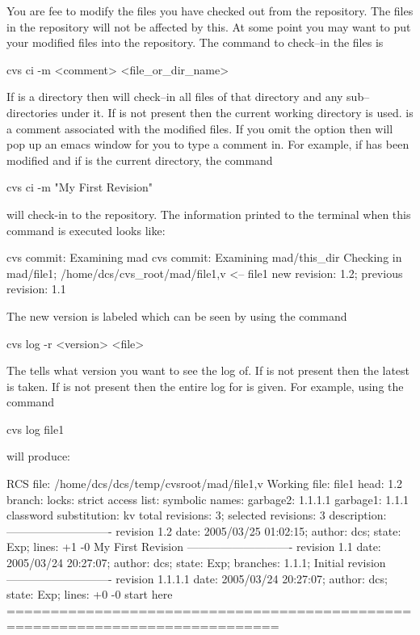 You are fee to modify the files you have checked out from the
repository. The files in the repository will not be affected by this.
At some point you may want to put your modified files into the
repository. The command to check--in the files is
\begin{example}
  cvs ci -m <comment> <file_or_dir_name>
\end{example}
If  is a directory then \cvs will check--in all
files of that directory and any sub--directories under it. If
 is not present then the current working
directory is used.  is a comment associated with the
modified files. If you omit the  option then \cvs
will pop up an emacs window for you to type a comment in.
For example, if  has been modified
and if  is the current directory, the command
\begin{example}
  cvs ci -m "My First Revision"
\end{example}
will check-in  to the repository. The information printed to
the terminal when this command is executed looks like:
\begin{example}
  cvs commit: Examining mad
  cvs commit: Examining mad/this_dir
  Checking in mad/file1;
  /home/dcs/cvs_root/mad/file1,v  <--  file1
  new revision: 1.2; previous revision: 1.1
\end{example}
The new version is labeled  which can be seen by using the command
\begin{example}
  cvs log -r <version> <file>
\end{example}
The  tells \cvs what version you want to see the log
of. If  is not present then the latest is taken. If
 is not present then the entire log for  is
given. For example, using the command 
\begin{example}
  cvs log file1
\end{example}
will produce:
\begin{example}
  RCS file: /home/dcs/dcs/temp/cvsroot/mad/file1,v
  Working file: file1
  head: 1.2
  branch:
  locks: strict
  access list:
  symbolic names:
          garbage2: 1.1.1.1
          garbage1: 1.1.1
  classword substitution: kv
  total revisions: 3;     selected revisions: 3
  description:
  ----------------------------
  revision 1.2
  date: 2005/03/25 01:02:15;  author: dcs;  state: Exp;  lines: +1 -0
  My First Revision
  ----------------------------
  revision 1.1
  date: 2005/03/24 20:27:07;  author: dcs;  state: Exp;
  branches:  1.1.1;
  Initial revision
  ----------------------------
  revision 1.1.1.1
  date: 2005/03/24 20:27:07;  author: dcs;  state: Exp;  lines: +0 -0
  start here
  =============================================================================
\end{example}
